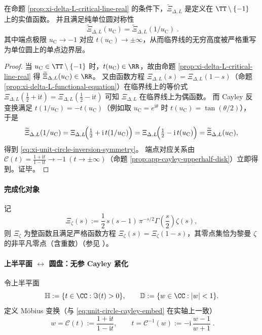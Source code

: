 \begin{proposition}\label{prop:xi-nonperiodic-phase-symmetry}
在命题 \ref{prop:xi-delta-L-critical-line-real} 的条件下，\(\widetilde{\Xi}_{\Delta,L}\) 是定义在 \(\TT\setminus\{-1\}\) 上的实值函数。
并且满足纯单位圆对称性
\begin{equation}\label{eq:xi-unit-circle-inversion-symmetry}
\boxed{\;
\widetilde{\Xi}_{\Delta,L}(u_{\mathrm C})
=\widetilde{\Xi}_{\Delta,L}(1/u_{\mathrm C})\; }.
\end{equation}
其中端点极限 \(u_{\mathrm C}\to-1\) 对应 \(t(u_{\mathrm C})\to\pm\infty\)，从而临界线的无穷高度被严格重写为单位圆上的单点边界层。
\end{proposition}
\begin{proof}
当 \(u_{\mathrm C}\in\TT\setminus\{-1\}\) 时，\(t(u_{\mathrm C})\in\RR\)，故由命题 \ref{prop:xi-delta-L-critical-line-real} 得 \(\widetilde{\Xi}_{\Delta,L}(u_{\mathrm C})\in\RR\)。
又由函数方程 \(\Xi_{\Delta,L}(s)=\Xi_{\Delta,L}(1-s)\)（命题 \ref{prop:xi-delta-L-functional-equation}）在临界线上的等价式
\(
\Xi_{\Delta,L}(\tfrac12+\mathrm{i}t)=\Xi_{\Delta,L}(\tfrac12-\mathrm{i}t)
\)
可知 \(\Xi_{\Delta,L}\) 在临界线上为偶函数。
而 Cayley 反变换满足 \(t(1/u_{\mathrm C})=-t(u_{\mathrm C})\)（例如取 \(u_{\mathrm C}=e^{\mathrm{i}\theta}\) 时 \(t(u_{\mathrm C})=\tan(\theta/2)\)），
于是
\[
\widetilde{\Xi}_{\Delta,L}(1/u_{\mathrm C})
=\Xi_{\Delta,L}\!\Bigl(\tfrac12+\mathrm{i}\,t(1/u_{\mathrm C})\Bigr)
=\Xi_{\Delta,L}\!\Bigl(\tfrac12-\mathrm{i}\,t(u_{\mathrm C})\Bigr)
=\widetilde{\Xi}_{\Delta,L}(u_{\mathrm C}),
\]
得到 \eqref{eq:xi-unit-circle-inversion-symmetry}。
端点对应关系由 \(\mathcal{C}(t)=\frac{1+\mathrm{i}t}{1-\mathrm{i}t}\to-1\ (t\to\pm\infty)\)（命题 \ref{prop:app-cayley-upperhalf-disk}）立即得到。证毕。
\end{proof}

\paragraph{完成化对象}
记
\begin{equation}\label{eq:app-xi-classical}
\Xi_{\zeta}(s):=\frac12\,s(s-1)\,\pi^{-s/2}\Gamma\!\left(\frac{s}{2}\right)\zeta(s),
\end{equation}
则 \(\Xi_{\zeta}\) 为整函数且满足严格函数方程 \(\Xi_{\zeta}(s)=\Xi_{\zeta}(1-s)\)，其零点集恰为黎曼 \(\zeta\) 的非平凡零点（含重数）（参见 \cite{Apostol1976}）。

\paragraph{上半平面 \texorpdfstring{$\leftrightarrow$}{<->} 圆盘：无参 Cayley 紧化}
令上半平面
\[
\mathbb{H}:=\{t\in\CC:\Im(t)>0\},
\qquad
\mathbb{D}:=\{w\in\CC:|w|<1\}.
\]
定义 Möbius 变换（与 \eqref{eq:unit-circle-cayley-embed} 在实轴上一致）
\begin{equation}\label{eq:app-cayley-disk}
\boxed{\;
w=\mathcal{C}(t):=\frac{1+\mathrm{i}t}{1-\mathrm{i}t},
\qquad
t=\mathcal{C}^{-1}(w):=-\mathrm{i}\,\frac{w-1}{w+1}\; }.
\end{equation}

